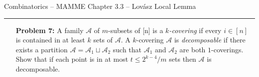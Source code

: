 \documentclass{amsart}
\theoremstyle{plain}
\theoremstyle{definition}
\begin{document}
    {\Large Combinatorics -- MAMME}
    {\Large Chapter 3.3 -- Lovász Local Lemma}

    \vspace{0.5cm}

    \hrule

    \vspace{0.5cm}

    \begin{enumerate}


    \item[\textbf{Problem 7:}]
    A family $\mathcal{A}$ of $m$-subsets of [n] is a \emph{$k$-covering} if every
    $i \in [n]$ is contained in at least $k$ sets of $\mathcal{A}$.
    A $k$-covering $\mathcal{A}$ is \emph{decomposable} if there exists a partition
    $\mathcal{A} = \mathcal{A}_1 \sqcup \mathcal{A}_2$ such that $\mathcal{A}_1$ and $\mathcal{A}_2$
    are both $1$-coverings.
    Show that if each point is in at most $t \leq 2^{k-4}/m$ sets then $\mathcal{A}$ is decomposable.



    \end{enumerate}
\end{document}
